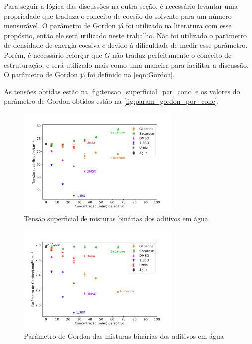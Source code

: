 		Para seguir a lógica das discussões na outra seção, é necessário levantar uma propriedade que traduza o conceito de coesão do solvente para um número mensurável. O parâmetro de Gordon já foi utilizado na literatura com esse propósito, então ele será utilizado neste trabalho.\cite{Moya2007a, Abdel-Rahem2012} Não foi utilizado o parâmetro de densidade de energia coesiva \(c\) devido à dificuldade de medir esse parâmetro. Porém, é necessário reforçar que \(G\) não traduz perfeitamente o conceito de estruturação, e será utilizado mais como uma maneira para facilitar a discussão. O parâmetro de Gordon já foi definido na \autoref{eqn:Gordon}.
		
		As tensões obtidas estão na \autoref{fig:tensao_superficial_por_conc} e os valores do parâmetro de Gordon obtidos estão na \autoref{fig:param_gordon_por_conc}. 
		
		\begin{figure}[h]
			\centering
			\includegraphics[width=0.7\textwidth]{imagens/propriedades/tensao_superficial}
			\caption{Tensão superficial de misturas binárias dos aditivos em água}
			\label{fig:tensao_superficial_por_conc}
		\end{figure}
		
		\begin{figure}[h]
			\centering
			\includegraphics[width=0.7\textwidth]{imagens/propriedades/param_gordon}
			\caption{Parâmetro de Gordon das misturas binárias dos aditivos em água}
			\label{fig:param_gordon_por_conc}
		\end{figure}
		
